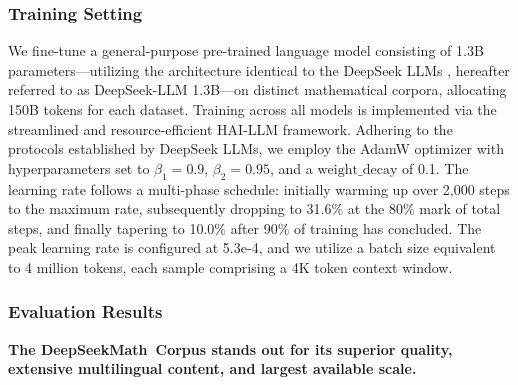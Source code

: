 \subsubsection{Training Setting}
\label{sec:quality-policy}
We fine-tune a general-purpose pre-trained language model consisting of 1.3B parameters—utilizing the architecture identical to the DeepSeek LLMs \citep{deepseek-llm}, hereafter referred to as DeepSeek-LLM 1.3B—on distinct mathematical corpora, allocating 150B tokens for each dataset. Training across all models is implemented via the streamlined and resource-efficient HAI-LLM \citep{haillm} framework. Adhering to the protocols established by DeepSeek LLMs, we employ the AdamW optimizer \citep{adamW} with hyperparameters set to $\beta_1=0.9$, $\beta_2=0.95$, and a $\mathrm{weight\_decay}$ of 0.1. The learning rate follows a multi-phase schedule: initially warming up over 2,000 steps to the maximum rate, subsequently dropping to 31.6\% at the 80\% mark of total steps, and finally tapering to 10.0\% after 90\% of training has concluded. The peak learning rate is configured at 5.3e-4, and we utilize a batch size equivalent to 4 million tokens, each sample comprising a 4K token context window.

\subsubsection{Evaluation Results}

\textbf{The DeepSeekMath~Corpus stands out for its superior quality, extensive multilingual content, and largest available scale.}

